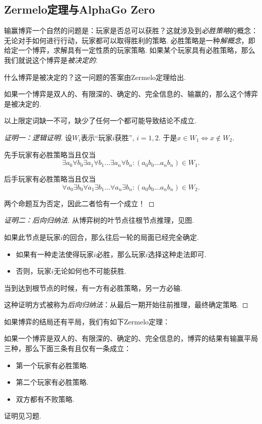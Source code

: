 \subsection{Zermelo定理与AlphaGo Zero}

输赢博弈一个自然的问题是：玩家是否总可以获胜？这就涉及到\emph{必胜策略}的概念：无论对手如何进行行动，玩家都可以取得胜利的策略. 必胜策略是一种\emph{解概念}，即给定一个博弈，求解具有一定性质的玩家策略. 如果某个玩家具有必胜策略，那么我们就说这个博弈是\emph{被决定的}. 

什么博弈是被决定的？这一问题的答案由Zermelo定理给出.

\begin{theorem}\label{thm:zermelo}
如果一个博弈是双人的、有限深的、确定的、完全信息的、输赢的，那么这个博弈是被决定的.
\end{theorem}
以上限定词缺一不可，缺少了任何一个都可能导致结论不成立.

\begin{proof}[证明一：逻辑证明]
设$W_i$表示“玩家$i$获胜”, $i=1,2$. 于是$x\in W_1\iff x\not\in W_2$.

先手玩家有必胜策略当且仅当
\[\exists a_0\forall b_0\exists a_1\forall b_1\dots\exists a_n\forall b_n: (a_0b_0\dots a_nb_n)\in W_1.\]

后手玩家有必胜策略当且仅当
\[\forall a_0\exists b_0\forall a_1\exists b_1\dots\forall a_n\exists b_n: (a_0b_0\dots a_nb_n)\in W_2.\]

两个命题互为否定，因此二者恰有一个成立！
\end{proof}

\begin{proof}[证明二：后向归纳法]
从博弈树的叶节点往根节点推理，见图.

如果此节点是玩家$i$的回合，那么往后一轮的局面已经完全确定.
\begin{itemize}
    \item 如果有一种走法使得玩家$i$必胜，那么玩家$i$选择这种走法即可.
    \item 否则，玩家$i$无论如何也不可能获胜.
\end{itemize}

当到达到根节点的时候，有一方有必胜策略，另一方必输.

这种证明方式被称为\emph{后向归纳法}：从最后一期开始往前推理，最终确定策略.
\end{proof}

如果博弈的结局还有平局，我们有如下Zermelo定理：
\begin{theorem}[有平局的Zermelo定理]\label{thm:zermelo-draw}
如果一个博弈是双人的、有限深的、确定的、完全信息的，博弈的结果有输赢平局三种，那么下面三条有且仅有一条成立：
\begin{itemize}
    \item 第一个玩家有必胜策略.
    \item 第二个玩家有必胜策略.
    \item 双方都有不败策略.
\end{itemize}
\end{theorem}
证明见习题. 

